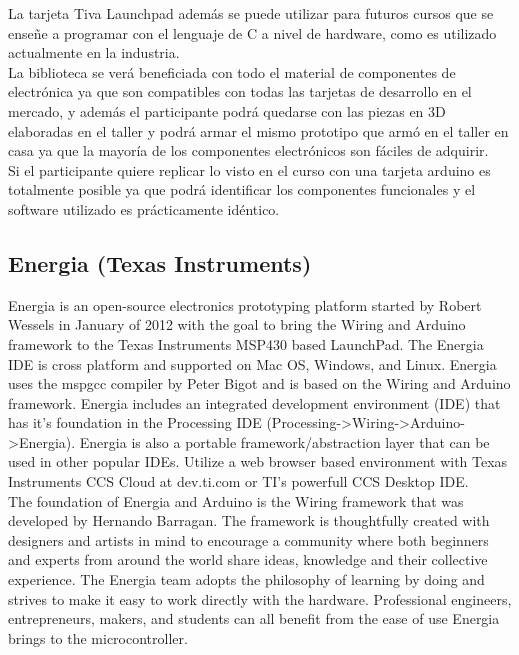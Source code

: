 \documentclass[]{article}
\begin{document}
La tarjeta Tiva Launchpad además se puede utilizar para futuros cursos que se enseñe a programar con el lenguaje de C a nivel de hardware, como es utilizado actualmente en la industria.\\

La biblioteca se verá beneficiada con todo el material de componentes de electrónica ya que son compatibles con todas las tarjetas de desarrollo en el mercado, y además el participante podrá quedarse con las piezas en 3D elaboradas en el taller y podrá armar el mismo prototipo que armó en el taller en casa ya que la mayoría de los componentes electrónicos son fáciles de adquirir.\\

Si el participante quiere replicar lo visto en el curso con una tarjeta arduino es totalmente posible ya que podrá identificar los componentes funcionales y el software utilizado es prácticamente idéntico.\\

\subsection{Energia (Texas Instruments)}


Energia is an open-source electronics prototyping platform started by Robert Wessels in January of 2012 with the goal to bring the Wiring and Arduino framework to the Texas Instruments MSP430 based LaunchPad. The Energia IDE is cross platform and supported on Mac OS, Windows, and Linux. Energia uses the mspgcc compiler by Peter Bigot and is based on the Wiring and Arduino framework. Energia includes an integrated development environment (IDE) that has it’s foundation in the Processing IDE (Processing->Wiring->Arduino->Energia). Energia is also a portable framework/abstraction layer that can be used in other popular IDEs. Utilize a web browser based environment with Texas Instruments CCS Cloud at dev.ti.com or TI’s powerfull CCS Desktop IDE.\cite{TX}\\

The foundation of Energia and Arduino is the Wiring framework that was developed by Hernando Barragan. The framework is thoughtfully created with designers and artists in mind to encourage a community where both beginners and experts from around the world share ideas, knowledge and their collective experience. The Energia team adopts the philosophy of learning by doing and strives to make it easy to work directly with the hardware. Professional engineers, entrepreneurs, makers, and students can all benefit from the ease of use Energia brings to the microcontroller.\cite{TX}\\
\end{document}
